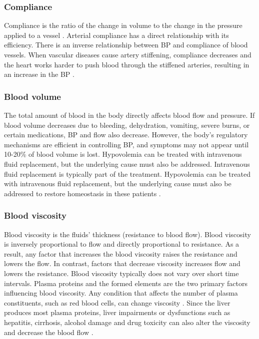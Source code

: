\documentclass[journal,article,moreauthors]{Definitions/mdpi}
\begin{document}
\subsubsection{Compliance} Compliance is the ratio of the change in volume to the change in the pressure applied to a vessel \citep{Glasser1997-ll}. Arterial compliance has a direct relationship with its efficiency. There is an inverse relationship between BP and compliance of blood vessels. When vascular diseases cause artery stiffening, compliance decreases and the heart works harder to push blood through the stiffened arteries, resulting in an increase in the BP
\citep{desaix2013anatomy}.

\subsubsection{Blood volume} The total amount of blood in the body directly affects blood flow and pressure. If blood volume decreases due to bleeding, dehydration, vomiting, severe burns, or certain medications, BP and flow also decrease. However, the body's regulatory mechanisms are efficient in controlling BP, and symptoms may not appear until 10-20\% of blood volume is lost. Hypovolemia can be treated with intravenous fluid replacement, but the underlying cause must also be addressed. Intravenous fluid replacement is typically part of the treatment. Hypovolemia can be treated with intravenous fluid replacement, but the underlying cause must also be addressed to restore homeostasis in these patients \citep{desaix2013anatomy, M12}.

\subsubsection{Blood viscosity} Blood viscosity is the fluids' thickness (resistance to blood flow). Blood viscosity is inversely proportional to flow and directly proportional to resistance. As a result, any factor that increases the blood viscosity raises the resistance and lowers the flow. In contrast, factors that decrease viscosity increases flow and lowers the resistance. Blood viscosity typically does not vary over short time intervals. Plasma proteins and the formed elements are the two primary factors influencing blood viscosity. Any condition that affects the number of plasma constituents, such as red blood cells, can change viscosity \citep{desaix2013anatomy}. Since the liver produces most plasma proteins, liver impairments or dysfunctions such as hepatitis, cirrhosis, alcohol damage and drug toxicity can also alter the viscosity and decrease the blood flow \citep{Letcher1981-qq}.
\end{document}
